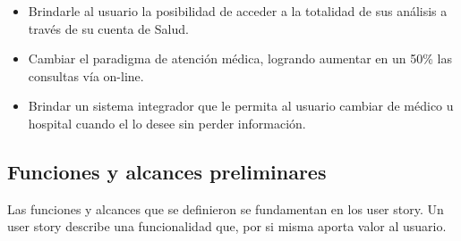 {    \begin{itemize}
	    \item Brindarle al usuario la posibilidad de acceder a la totalidad de sus análisis a través de su cuenta de Salud.
    	\item Cambiar el paradigma de atención médica, logrando aumentar en un 50\% las consultas vía on-line.
        \item Brindar un sistema integrador que le permita al usuario cambiar de médico u hospital cuando el lo desee sin perder información.
	\end{itemize}
	}



\subsection{Funciones y alcances preliminares}
Las funciones y alcances que se definieron se fundamentan en los user story. Un user story describe una funcionalidad que, por si misma aporta valor al usuario.

